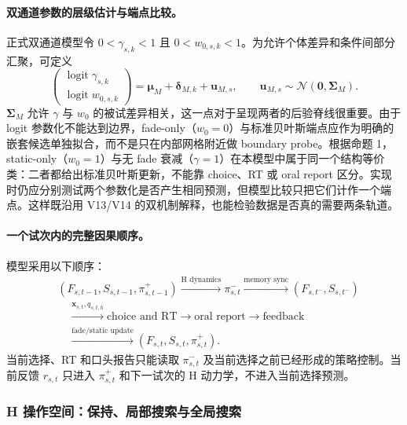 \paragraph{双通道参数的层级估计与端点比较。}
正式双通道模型令 $0<\gamma_{s,k}<1$ 且 $0<w_{0,s,k}<1$。为允许个体差异和条件间部分汇聚，可定义
\begin{equation}
    \begin{pmatrix}
      \operatorname{logit}\gamma_{s,k}\\
      \operatorname{logit}w_{0,s,k}
    \end{pmatrix}
    =\boldsymbol\mu_M
     +\boldsymbol\delta_{M,k}
     +\mathbf u_{M,s},
    \qquad
    \mathbf u_{M,s}\sim
    \mathcal N(\mathbf0,\boldsymbol\Sigma_M).
    \label{eq:model0803-memory-hierarchy}
\end{equation}
$\boldsymbol\Sigma_M$ 允许 $\gamma$ 与 $w_0$ 的被试差异相关，这一点对于呈现两者的后验脊线很重要。由于 logit 参数化不能达到边界，fade-only（$w_0=0$）与标准贝叶斯端点应作为明确的嵌套候选单独拟合，而不是只在内部网格附近做 boundary probe。根据命题 1，static-only（$w_0=1$）与无 fade 衰减（$\gamma=1$）在本模型中属于同一个结构等价类：二者都给出标准贝叶斯更新，不能靠 choice、RT 或 oral report 区分。实现时仍应分别测试两个参数化是否产生相同预测，但模型比较只把它们计作一个端点。这样既沿用 V13/V14 的双机制解释，也能检验数据是否真的需要两条轨道。

\paragraph{一个试次内的完整因果顺序。}
模型采用以下顺序：
\begin{equation}
\begin{aligned}
&(F_{s,t-1},S_{s,t-1},\pi^+_{s,t-1})
\xrightarrow{\text{H dynamics}}
\pi^-_{s,t}
\xrightarrow{\text{memory sync}}
(F_{s,t^-},S_{s,t^-})\\
&\quad\xrightarrow{\mathbf x_{s,t},q_{s,t,h}}
\text{choice and RT}
\longrightarrow
\text{oral report}
\longrightarrow
\text{feedback}\\
&\quad\xrightarrow{\text{fade/static update}}
(F_{s,t},S_{s,t},\pi^+_{s,t}).
\end{aligned}
\label{eq:model0803-trial-order}
\end{equation}
当前选择、RT 和口头报告只能读取 $\pi^-_{s,t}$ 及当前选择之前已经形成的策略控制。当前反馈 $r_{s,t}$ 只进入 $\pi^+_{s,t}$ 和下一试次的 H 动力学，不进入当前选择预测。


\subsubsection{H 操作空间：保持、局部搜索与全局搜索}

